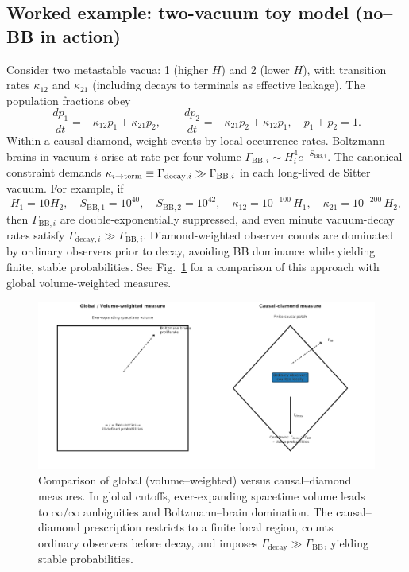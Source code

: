 \documentclass[12pt]{article}
\theoremstyle{remark}
\begin{document}
\subsection*{Worked example: two-vacuum toy model (no--BB in action)}
Consider two metastable vacua: 1 (higher $H$) and 2 (lower $H$), with transition rates $\kappa_{12}$ and $\kappa_{21}$ (including decays to terminals as effective leakage). The population fractions obey
\begin{equation}
 \frac{dp_1}{dt}= -\kappa_{12} p_1 + \kappa_{21} p_2,\qquad \frac{dp_2}{dt}= -\kappa_{21} p_2 + \kappa_{12} p_1,\quad p_1{+}p_2=1.
\end{equation}
Within a causal diamond, weight events by local occurrence rates. Boltzmann brains in vacuum $i$ arise at rate per four-volume $\Gamma_{\mathrm{BB},i}\sim H_i^4 e^{-S_{\mathrm{BB},i}}$. The canonical constraint demands $\kappa_{i\to{\rm term}}\equiv \Gamma_{\mathrm{decay},i} \gg \Gamma_{\mathrm{BB},i}$ in each long-lived de Sitter vacuum. For example, if
\[
 H_1=10 H_2,\quad S_{\mathrm{BB},1}=10^{40},\quad S_{\mathrm{BB},2}=10^{42},\quad \kappa_{12}=10^{-100}\,H_1,\quad \kappa_{21}=10^{-200}\,H_2,
\]
then $\Gamma_{\mathrm{BB},i}$ are double-exponentially suppressed, and even minute vacuum-decay rates satisfy $\Gamma_{\mathrm{decay},i}\!\gg\!\Gamma_{\mathrm{BB},i}$. Diamond-weighted observer counts are dominated by ordinary observers prior to decay, avoiding BB dominance while yielding finite, stable probabilities. See Fig.~\ref{fig:global-vs-diamond} for a comparison of this approach with global volume-weighted measures.

\begin{figure}[t]
  \centering
  \includegraphics[width=0.95\linewidth]{figs/fig_global_vs_diamond.pdf}
  \caption{Comparison of global (volume–weighted) versus causal–diamond measures. 
  In global cutoffs, ever-expanding spacetime volume leads to $\infty/\infty$ ambiguities 
  and Boltzmann–brain domination. 
  The causal–diamond prescription restricts to a finite local region, 
  counts ordinary observers before decay, and imposes 
  $\Gamma_{\mathrm{decay}} \gg \Gamma_{\mathrm{BB}}$, yielding stable probabilities.}
  \label{fig:global-vs-diamond}
\end{figure}
\end{document}
